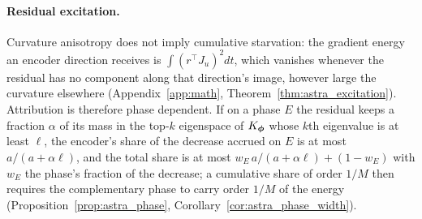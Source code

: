 \paragraph{Residual excitation.}
\label{prop:excitation}
Curvature anisotropy does not imply cumulative starvation: the gradient
energy an encoder direction receives is $\int(r^\top J_u)^2dt$, which
vanishes whenever the residual has no component along that direction's
image, however large the curvature elsewhere (Appendix~\ref{app:math},
Theorem~\ref{thm:astra_excitation}). Attribution is therefore phase
dependent. If on a phase $E$ the residual keeps a fraction $\alpha$ of its
mass in the top-$k$ eigenspace of $K_{\boldsymbol{\phi}}$ whose $k$th eigenvalue is at
least $\ell$, the encoder's share of the decrease accrued on $E$ is at most
$a/(a+\alpha\ell)$, and the total share is at most
$w_E\,a/(a+\alpha\ell)+(1-w_E)$ with $w_E$ the phase's fraction of the
decrease; a cumulative share of order $1/M$ then requires the complementary
phase to carry order $1/M$ of the energy
(Proposition~\ref{prop:astra_phase}, Corollary~\ref{cor:astra_phase_width}).
